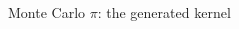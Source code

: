 \documentclass[@BEAMER_OPTIONS@]{beamer}
\begin{document}
\begin{frame}[fragile]{Monte Carlo $\pi$: the generated kernel}
    \begin{columns}
        \begin{column}[t]{0.2\textwidth}
            \begin{exampleblock}{}
                \begin{adjustbox}{width=0.23\textwidth, height=\textheight, keepaspectratio}
                    \begin{minipage}{\textwidth}
                        
                    \end{minipage}
                \end{adjustbox}
            \end{exampleblock}
        \end{column}
        \begin{column}[t]{0.2\textwidth}
            \begin{exampleblock}{}
                \begin{adjustbox}{width=0.23\textwidth, height=\textheight, keepaspectratio}
                    \begin{minipage}{\textwidth}
                        
                    \end{minipage}
                \end{adjustbox}
            \end{exampleblock}
        \end{column}
        \begin{column}[t]{0.2\textwidth}
            \begin{exampleblock}{}
                \begin{adjustbox}{width=0.23\textwidth, height=\textheight, keepaspectratio}
                    \begin{minipage}{\textwidth}
                        
                    \end{minipage}
                \end{adjustbox}
            \end{exampleblock}
        \end{column}
        \begin{column}[t]{0.3\textwidth}
            \begin{exampleblock}{}

\end{exampleblock}
\end{column}
\end{columns}
\end{frame}
\end{document}
